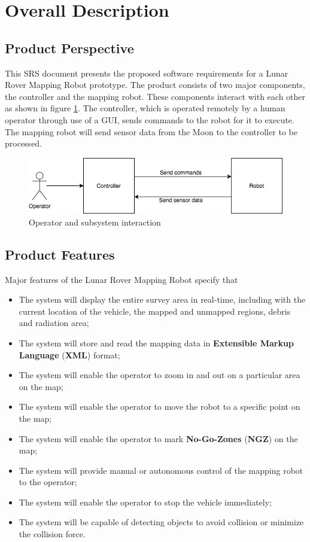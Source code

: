 \documentclass[12pt,a4paper]{article}
\begin{document}
	\newpage
	\section{Overall Description}
	\subsection{Product Perspective}
    This SRS document presents the proposed software requirements for a Lunar Rover Mapping Robot prototype. The product consists of two major components, the controller and the mapping robot. These components interact with each other as shown in figure \ref{fig:sys1}. The controller, which is operated remotely by a human operator through use of a GUI, sends commands to the robot for it to execute. The mapping robot will send sensor data from the Moon to the controller to be processed.
    \begin{figure}[h]
        \centering
        \includegraphics[scale=0.7]{SRS_product_perspective}
        \caption{Operator and subsystem interaction}
        \label{fig:sys1}
    \end{figure}   
	\subsection{Product Features}
     Major features of the Lunar Rover Mapping Robot specify that 
   \begin{itemize}
\item The system will display the entire survey area in real-time, including with the current location of the vehicle, the mapped and unmapped regions, debris and radiation area;
\item The system will store and read the mapping data in \textbf{Extensible Markup Language} (\textbf{XML}) format;
\item The system will enable the operator to zoom in and out on a particular area on the map;
\item The system will enable the operator to move the robot to a specific point on the map;
\item The system will enable the operator to mark \textbf{No-Go-Zones} (\textbf{NGZ}) on the map;
\item The system will provide manual or autonomous control of the mapping robot to the operator;
\item The system will enable the operator to stop the vehicle immediately;
\item The system will be capable of detecting objects to avoid collision or minimize the collision force.
\end{itemize}
\end{document}
